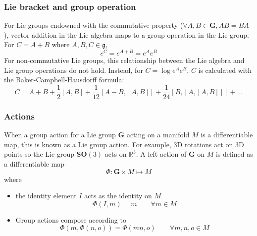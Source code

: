 		\subsubsection{Lie bracket and group operation}			
			For Lie groups endowned with the commutative property ($\forall A,B \in \mathbf{G}, AB = BA$), vector addition in the Lie algebra maps to a group operation in the Lie group. For $C = A + B$ where $A,B,C \in \mathfrak{g}$,
			\begin{equation}
				e^C = e^{A+B} = e^Ae^B
			\end{equation}
			For non-commutative Lie groups, this relationship between the Lie algebra and Lie group operations do not hold. Instead, for $C = \log{e^Ae^B}$, $C$ is calculated with the Baker-Campbell-Hausdorff formula:
			\begin{equation}
				C = A + B + \frac{1}{2}[A,B] + \frac{1}{12}[A-B,[A,B]] + \frac{1}{24}[B,[A,[A,B]]] + \dots
			\end{equation}	
		
		\subsubsection{Actions}
			When a group action for a Lie group $\mathbf{G}$ acting on a manifold $M$ is a differentiable map, this is known as a Lie group action. For example, 3D rotations act on 3D points so the Lie group $\mathbf{SO}(3)$ acts on $\mathbb{R}^3$. A left action of $\mathbf{G}$ on $M$ is defined as a differentiable map
			\begin{equation}
				\Phi: \mathbf{G} \times M \mapsto M
			\end{equation}
			where
			\begin{itemize}
			\item the identity element $I$ acts as the identity on $M$
				\begin{equation}
					\Phi(I,m) = m \hspace{2em} \forall m \in M
				\end{equation}
			\item Group actions compose according to
				\begin{equation}
					\Phi(m,\Phi(n,o)) = \Phi(mn,o) \hspace{2em} \forall m,n,o \in M
				\end{equation}
			\end{itemize}
		

